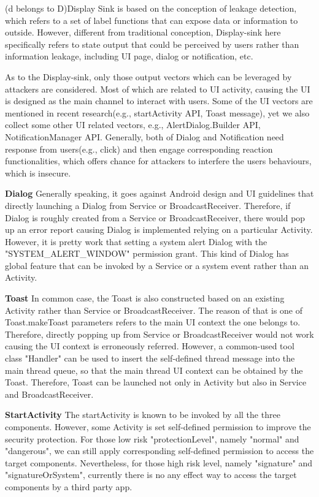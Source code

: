 \documentclass{sig-alternate-05-2015}
\begin{document}
(d belongs to D)Display Sink is based on the conception of leakage detection, which refers to a set of label functions that can expose data or information to outside. However, different from traditional conception, Display-sink here specifically refers to state output that could be perceived by users rather than information leakage, including UI page, dialog or notification, etc.

As to the Display-sink, only those output vectors which can be leveraged by attackers are considered. Most of which are related to UI activity, causing the UI is designed as the main channel to interact with users. Some of the UI vectors are mentioned in recent research\cite{bianchi2015app}(e.g., startActivity API, Toast message), yet we also collect some other UI related vectors, e.g., AlertDialog.Builder API, NotificationManager API. Generally, both of Dialog and Notification need response from users(e.g., click) and then engage corresponding reaction functionalities, which offers chance for attackers to interfere the users behaviours, which is insecure.

\textbf{Dialog}
Generally speaking, it goes against Android design and UI guidelines that directly launching a Dialog from Service or BroadcastReceiver. Therefore, if Dialog is roughly created from a Service or BroadcastReceiver, there would pop up an error report causing Dialog is implemented relying on a particular Activity. However, it is pretty work that setting a system alert Dialog with the "SYSTEM\_ALERT\_WINDOW" permission grant. This kind of Dialog has global feature that can be invoked by a Service or a system event rather than an Activity. 

\textbf{Toast}
In common case, the Toast is also constructed based on an existing Activity rather than Service or BroadcastReceiver. The reason of that is one of Toast.makeToast parameters refers to the main UI context the one belongs to. Therefore, directly popping up from Service or BroadcastReceiver would not work causing the UI context is erroneously referred. However, a common-used tool class "Handler" can be used to insert the self-defined thread message into the main thread queue, so that the main thread UI context can be obtained by the Toast. Therefore, Toast can be launched not only in Activity but also in Service and BroadcastReceiver.

\textbf{StartActivity}
The startActivity is known to be invoked by all the three components. However, some Activity is set self-defined permission to improve the security protection. For those low risk "protectionLevel", namely "normal" and "dangerous", we can still apply corresponding self-defined permission to access the target components. Nevertheless, for those high risk level, namely "signature" and "signatureOrSystem", currently there is no any effect way to access the target components by a third party app.
\end{document}
